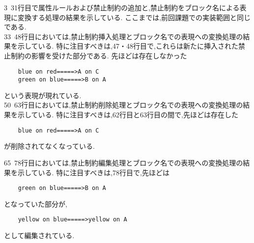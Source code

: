 \documentclass[uplatex,12pt]{jsarticle}
\begin{document}
3~31行目で属性ルールおよび禁止制約の追加と,禁止制約をブロック名による表現に変換する処理の結果を示している.
ここまでは,前回課題での実装範囲と同じである. \\

33~48行目においては,禁止制約挿入処理とブロック名での表現への変換処理の結果を示している.
特に注目すべきは,47・48行目で,これらは新たに挿入された禁止制約の影響を受けた部分である.
先ほどは存在しなかった
\begin{verbatim}
    blue on red=====>A on C
    green on blue=====>B on A
\end{verbatim}
という表現が現れている. \\

50~63行目においては,禁止制約削除処理とブロック名での表現への変換処理の結果を示している.
特に注目すべきは,62行目と63行目の間で,先ほどは存在した
\begin{verbatim}
    blue on red=====>A on C
\end{verbatim}
が削除されてなくなっている.

65~78行目においては,禁止制約編集処理とブロック名での表現への変換処理の結果を示している.
特に注目すべきは,78行目で,先ほどは
\begin{verbatim}
    green on blue=====>B on A
\end{verbatim}
となっていた部分が,
\begin{verbatim}
    yellow on blue=====>yellow on A
\end{verbatim}
として編集されている.
\end{document}
